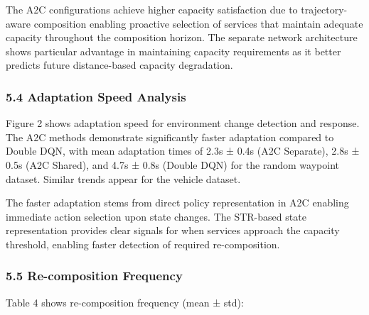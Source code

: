 \documentclass[
  10pt,
  twocolumn,
]{article}
\begin{document}
The A2C configurations achieve higher capacity satisfaction due to
trajectory-aware composition enabling proactive selection of services
that maintain adequate capacity throughout the composition horizon. The
separate network architecture shows particular advantage in maintaining
capacity requirements as it better predicts future distance-based
capacity degradation.

\hypertarget{adaptation-speed-analysis}{%
	\subsubsection{5.4 Adaptation Speed
		Analysis}\label{adaptation-speed-analysis}}

Figure 2 shows adaptation speed for environment change detection and
response. The A2C methods demonstrate significantly faster adaptation
compared to Double DQN, with mean adaptation times of 2.3s ± 0.4s (A2C
Separate), 2.8s ± 0.5s (A2C Shared), and 4.7s ± 0.8s (Double DQN) for
the random waypoint dataset. Similar trends appear for the vehicle
dataset.

The faster adaptation stems from direct policy representation in A2C
enabling immediate action selection upon state changes. The STR-based
state representation provides clear signals for when services approach
the capacity threshold, enabling faster detection of required
re-composition.

\hypertarget{re-composition-frequency}{%
	\subsubsection{5.5 Re-composition
		Frequency}\label{re-composition-frequency}}

Table 4 shows re-composition frequency (mean ± std):
\end{document}

